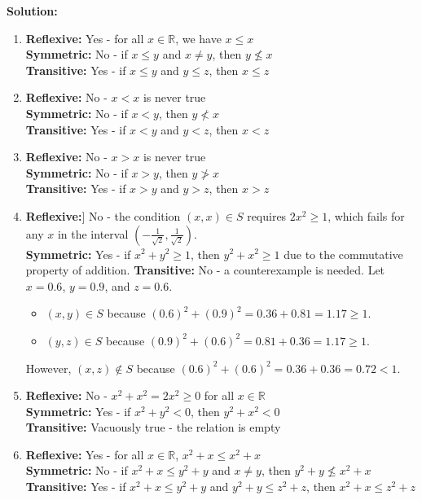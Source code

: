 \textbf{Solution:}  
\begin{enumerate}[label=(\alph*)]
\item \textbf{Reflexive:} Yes - for all $x \in \mathbb{R}$, we have $x \leq x$ \\
\textbf{Symmetric:} No - if $x \leq y$ and $x \neq y$, then $y \not\leq x$ \\
\textbf{Transitive:} Yes - if $x \leq y$ and $y \leq z$, then $x \leq z$

\item \textbf{Reflexive:} No - $x < x$ is never true \\
\textbf{Symmetric:} No - if $x < y$, then $y \not< x$ \\
\textbf{Transitive:} Yes - if $x < y$ and $y < z$, then $x < z$

\item \textbf{Reflexive:} No - $x > x$ is never true \\
\textbf{Symmetric:} No - if $x > y$, then $y \not> x$ \\
\textbf{Transitive:} Yes - if $x > y$ and $y > z$, then $x > z$

\item  \textbf{Reflexive:}] No - the condition $(x,x) \in S$ requires $2x^2 \geq 1$, which fails for any $x$ in the interval $(-\frac{1}{\sqrt{2}}, \frac{1}{\sqrt{2}})$. \\
\textbf{Symmetric:} Yes - if $x^2 + y^2 \geq 1$, then $y^2 + x^2 \geq 1$ due to the commutative property of addition. 
\textbf{Transitive:} No - a counterexample is needed. Let $x = 0.6$, $y = 0.9$, and $z = 0.6$.
\begin{itemize}
\item $(x,y) \in S$ because $(0.6)^2 + (0.9)^2 = 0.36 + 0.81 = 1.17 \geq 1$.
\item $(y,z) \in S$ because $(0.9)^2 + (0.6)^2 = 0.81 + 0.36 = 1.17 \geq 1$.
\end{itemize}
However, $(x,z) \notin S$ because $(0.6)^2 + (0.6)^2 = 0.36 + 0.36 = 0.72 < 1$.

\item \textbf{Reflexive:} No - $x^2 + x^2 = 2x^2 \geq 0$ for all $x \in \mathbb{R}$ \\
\textbf{Symmetric:} Yes - if $x^2 + y^2 < 0$, then $y^2 + x^2 < 0$ \\
\textbf{Transitive:} Vacuously true - the relation is empty

\item \textbf{Reflexive:} Yes - for all $x \in \mathbb{R}$, $x^2 + x \leq x^2 + x$ \\
\textbf{Symmetric:} No - if $x^2 + x \leq y^2 + y$ and $x \neq y$, then $y^2 + y \not\leq x^2 + x$ \\
\textbf{Transitive:} Yes - if $x^2 + x \leq y^2 + y$ and $y^2 + y \leq z^2 + z$, then $x^2 + x \leq z^2 + z$
\end{enumerate}


